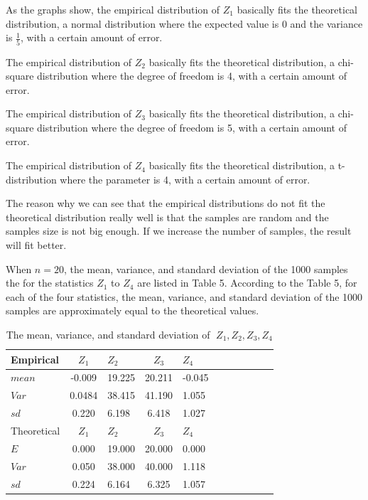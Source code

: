 \documentclass[a4paper,11pt,fleqn]{article}
\begin{document}
\vskip 0.5cm
\newpage
As the graphs show, the empirical distribution of $Z_1$ basically fits the theoretical distribution, a normal distribution where the expected value is 0 and the variance is $\frac{1}{5}$, with a certain amount of error.

The empirical distribution of $Z_2$ basically fits the theoretical distribution, a chi-square distribution where the degree of freedom is 4, with a certain amount of error.

The empirical distribution of $Z_3$ basically fits the theoretical distribution, a chi-square distribution where the degree of freedom is 5, with a certain amount of error.

The empirical distribution of $Z_4$ basically fits the theoretical distribution, a t-distribution where the parameter is 4, with a certain amount of error.

The reason why we can see that the empirical distributions do not fit the theoretical distribution really well is that the samples are random and the samples size is not big enough. If we increase the number of samples, the result will fit better.
\vskip 0.5cm
\newpage



When $n = 20$,  the mean, variance, and standard deviation of the 1000 samples the for the statistics $Z_1$ to $Z_4$ are listed in Table 5. According to the Table 5, for each of the four statistics, the mean, variance, and standard deviation of the 1000 samples are approximately equal to  the theoretical values.
\vskip 0.5cm

\begin{table}[htbp]
\caption{The mean, variance, and standard deviation of $\;Z_1, Z_2, Z_3, Z_4 $}
\vskip 0.5cm
\centering
 \begin{tabular}{lclclclclcl}
 \toprule
Empirical &$Z_1$  &$Z_2$  &$Z_3$  &$Z_4$  \\
 \midrule
$mean$    & -0.009   &  19.225   & 20.211    & -0.045 \\
$Var$     & 0.0484   &  38.415   & 41.190    & 1.055 \\
$sd $     & 0.220    &  6.198    & 6.418     & 1.027 \\
 \midrule
Theoretical &$Z_1$  &$Z_2$  &$Z_3$  &$Z_4$  \\
  \midrule
$E$       & 0.000     &  19.000    & 20.000    & 0.000 \\
$Var$     & 0.050  &  38.000    & 40.000    & 1.118 \\
$sd $     & 0.224  &  6.164  & 6.325   & 1.057\\
  \bottomrule
 \end{tabular}
\end{table}
\end{document}
